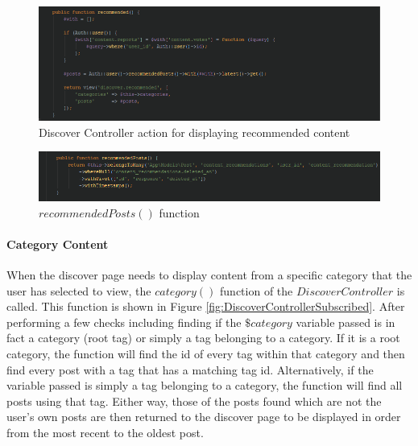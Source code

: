 \begin{figure}[H]
\centering
\includegraphics[width=\textwidth]{Images/Implementation/DiscoverControllerRecommended}
\caption{Discover Controller action for displaying recommended content }
\label{fig:DiscoverControllerRecommended}
\end{figure}

\begin{figure}[H]
\centering
\includegraphics[width=\textwidth]{Images/Implementation/RecommendedPosts}
\caption{\(recommendedPosts()\) function}
\label{fig:RecommendedPosts}
\end{figure}

\paragraph{Category Content}
When the discover page needs to display content from a specific category that the user has selected to view, the \(category()\) function of the \(Discover  Controller\) is called. This function is shown in Figure \ref{fig:DiscoverControllerSubscribed}. After performing a few checks including finding if the \(\$category\) variable passed is in fact a category (root tag) or simply a tag belonging to a category. If it is a root category, the function will find the id of every tag within that category and then find every post with a tag that has a matching tag id. Alternatively, if the variable passed is simply a tag belonging to a category, the function will find all posts using that tag. Either way, those of the posts found which are not the user's own posts are then returned to the discover page to be displayed in order from the most recent to the oldest post.

